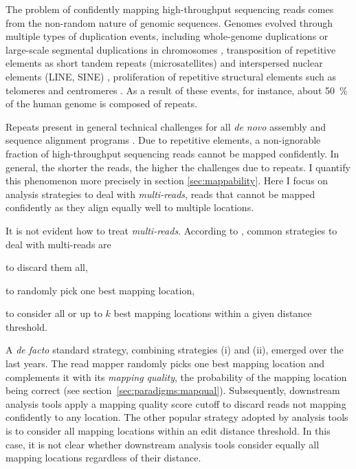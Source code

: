 The problem of confidently mapping high-throughput sequencing reads comes from the non-random nature of genomic sequences.
Genomes evolved through multiple types of duplication events, including whole-genome duplications \citep{Wolfe1997,Dehal2005} or large-scale segmental duplications in chromosomes \citep{Bailey2001,Samonte2002}, transposition of repetitive elements as short tandem repeats (microsatellites) \citep{Wang1994a,Wooster1994} and interspersed nuclear elements (LINE, SINE) \citep{Smit1996}, proliferation of repetitive structural elements such as telomeres and centromeres \citep{Meyne1990}.
As a result of these events, for instance, about 50~\% of the human genome is composed of repeats.

Repeats present in general technical challenges for all \emph{de novo} assembly and sequence alignment programs \citep{Treangen2011}.
Due to repetitive elements, a non-ignorable fraction of high-throughput sequencing reads cannot be mapped confidently.
In general, the shorter the reads, the higher the challenges due to repeats.
I quantify this phenomenon more precisely in section \ref{sec:mappability}.
Here I focus on analysis strategies to deal with \emph{multi-reads}, \ie reads that cannot be mapped confidently as they align equally well to multiple locations.

It is not evident how to treat \emph{multi-reads}.
According to \citeauthor{Treangen2011}, common strategies to deal with multi-reads are
\begin{inparaenum}[(i)]
\item to discard them all,
\item to randomly pick one best mapping location,
\item to consider all or up to $k$ best mapping locations within a given distance threshold.
\end{inparaenum}
A \emph{de facto} standard strategy, combining strategies (i) and (ii), emerged over the last years.
The read mapper randomly picks one best mapping location and complements it with its \emph{mapping quality}, \ie the probability of the mapping location being correct (see section~\ref{sec:paradigms:mapqual}).
Subsequently, downstream analysis tools apply a mapping quality score cutoff to discard reads not mapping confidently to any location.
The other popular strategy adopted by analysis tools is to consider all mapping locations within an edit distance threshold.
In this case, it is not clear whether downstream analysis tools consider equally all mapping locations regardless of their distance.

